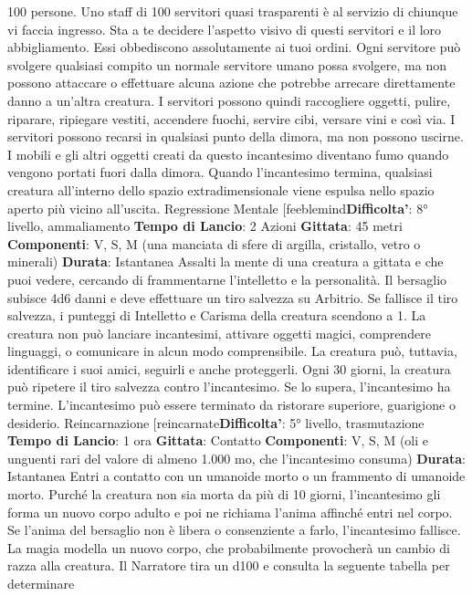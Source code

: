 \begin{multicols}{2}
100 persone. Uno staff di 100 servitori quasi trasparenti
è al servizio di chiunque vi faccia ingresso. Sta a te
decidere l’aspetto visivo di questi servitori e il loro
abbigliamento. Essi obbediscono assolutamente ai tuoi
ordini. Ogni servitore può svolgere qualsiasi compito un
normale servitore umano possa svolgere, ma non
possono attaccare o effettuare alcuna azione che
potrebbe arrecare direttamente danno a un’altra
creatura. I servitori possono quindi raccogliere oggetti,
pulire, riparare, ripiegare vestiti, accendere fuochi,
servire cibi, versare vini e così via. I servitori possono
recarsi in qualsiasi punto della dimora, ma non possono
uscirne. I mobili e gli altri oggetti creati da questo
incantesimo diventano fumo quando vengono portati
fuori dalla dimora. Quando l’incantesimo termina,
qualsiasi creatura all’interno dello spazio
extradimensionale viene espulsa nello spazio aperto più
vicino all’uscita.
Regressione Mentale
[feeblemind\textbf{Difficolta'}:
8° livello, ammaliamento
\textbf{Tempo di Lancio}: 2 Azioni
\textbf{Gittata}: 45 metri
\textbf{Componenti}: V, S, M (una manciata di sfere di argilla,
cristallo, vetro o minerali)
\textbf{Durata}: Istantanea
Assalti la mente di una creatura a gittata e che puoi
vedere, cercando di frammentarne l’intelletto e la
personalità. Il bersaglio subisce 4d6 danni e
deve effettuare un tiro salvezza su Arbitrio.
Se fallisce il tiro salvezza, i punteggi di Intelletto e
Carisma della creatura scendono a 1. La creatura non
può lanciare incantesimi, attivare oggetti magici,
comprendere linguaggi, o comunicare in alcun modo
comprensibile. La creatura può, tuttavia, identificare i
suoi amici, seguirli e anche proteggerli.
Ogni 30 giorni, la creatura può ripetere il tiro salvezza
contro l’incantesimo. Se lo supera, l’incantesimo ha
termine.
L’incantesimo può essere terminato da ristorare
superiore, guarigione o desiderio.
Reincarnazione
[reincarnate\textbf{Difficolta'}:
5° livello, trasmutazione
\textbf{Tempo di Lancio}: 1 ora
\textbf{Gittata}: Contatto
\textbf{Componenti}: V, S, M (oli e unguenti rari del valore di
almeno 1.000 mo, che l’incantesimo consuma)
\textbf{Durata}: Istantanea
Entri a contatto con un umanoide morto o un frammento
di umanoide morto. Purché la creatura non sia morta da
più di 10 giorni, l’incantesimo gli forma un nuovo corpo
adulto e poi ne richiama l’anima affinché entri nel corpo.
Se l’anima del bersaglio non è libera o consenziente a
farlo, l’incantesimo fallisce.
La magia modella un nuovo corpo, che probabilmente
provocherà un cambio di razza alla creatura. Il Narratore tira
un d100 e consulta la seguente tabella per determinare

\end{multicols}
